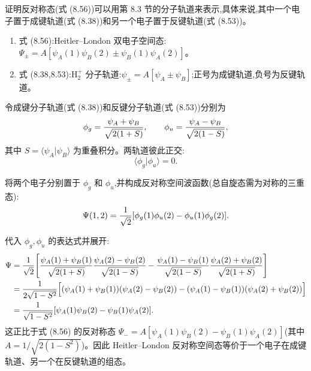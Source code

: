 \begin{question}
证明反对称态(式 (8.56))可以用第 8.3 节的分子轨道来表示,具体来说,其中一个电子置于成键轨道(式 (8.38))和另一个电子置于反键轨道(式 (8.53))。

\par\smallskip
{}
\begin{enumerate}[leftmargin=2.2em,itemsep=0.12em,topsep=0.12em,parsep=0pt]
\item 式 (8.56):Heitler--London 双电子空间态:$\Psi_\pm=A[\psi_A(1)\psi_B(2)\pm\psi_B(1)\psi_A(2)]$。
\item 式 (8.38,8.53):$\mathrm H_2^+$ 分子轨道:$\psi_\pm=A[\psi_A\pm\psi_B]$;正号为成键轨道,负号为反键轨道。
\end{enumerate}

\end{question}
\begin{solution}
令成键分子轨道(式 (8.38))和反键分子轨道(式 (8.53))分别为
\[
\phi_g={\psi_A+\psi_B\over\sqrt{2(1+S)}},\qquad
\phi_u={\psi_A-\psi_B\over\sqrt{2(1-S)}},
\]
其中 $S=\langle\psi_A|\psi_B\rangle$ 为重叠积分。两轨道彼此正交:
\[
\langle\phi_g|\phi_u\rangle=0.
\]

将两个电子分别置于 $\phi_g$ 和 $\phi_u$,并构成反对称空间波函数(总自旋态需为对称的三重态):
\[
\Psi(1,2)={1\over\sqrt2}[\phi_g(1)\phi_u(2)-\phi_u(1)\phi_g(2)].
\]

代入 $\phi_g,\phi_u$ 的表达式并展开:
\[
\begin{aligned}
\Psi&={1\over\sqrt2}\Bigg[
{\psi_A(1)+\psi_B(1)\over\sqrt{2(1+S)}}{\psi_A(2)-\psi_B(2)\over\sqrt{2(1-S)}}
-{\psi_A(1)-\psi_B(1)\over\sqrt{2(1-S)}}{\psi_A(2)+\psi_B(2)\over\sqrt{2(1+S)}}\Bigg]\\
&={1\over2\sqrt{1-S^2}}\Bigl[
(\psi_A(1)+\psi_B(1))(\psi_A(2)-\psi_B(2))
-(\psi_A(1)-\psi_B(1))(\psi_A(2)+\psi_B(2))\Bigr]\\
&={1\over\sqrt{1-S^2}}[\psi_A(1)\psi_B(2)-\psi_B(1)\psi_A(2)].
\end{aligned}
\]
这正比于式 (8.56) 的反对称态 $\Psi_-=A[\psi_A(1)\psi_B(2)-\psi_B(1)\psi_A(2)]$(其中 $A=1/\sqrt{2(1-S^2)}$)。因此 Heitler--London 反对称空间态等价于一个电子在成键轨道、另一个在反键轨道的组态。
\end{solution}

